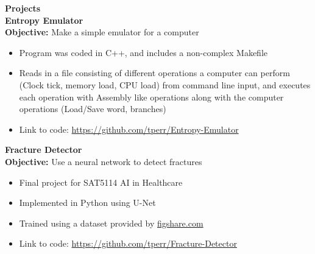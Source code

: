 \textbf{\large Projects\normalsize\\
Entropy Emulator\\
Objective:} Make a simple emulator for a computer
\begin{itemize}
    \item Program was coded in C++, and includes a non-complex Makefile
    \item Reads in a file consisting of different operations a computer can perform (Clock tick, memory load, CPU load) from command line input, and executes each operation with Assembly like operations along with the computer operations (Load/Save word, branches)
    \item Link to code: \url{https://github.com/tperr/Entropy-Emulator}
\end{itemize}
\textbf{Fracture Detector\\
Objective:} Use a neural network to detect fractures
\begin{itemize}
    \item Final project for SAT5114 AI in Healthcare
    \item Implemented in Python using U-Net
    \item Trained using a dataset provided by \url{figshare.com}
    \item Link to code: \url{https://github.com/tperr/Fracture-Detector}
\end{itemize}
